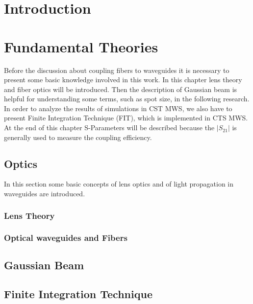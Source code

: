 
\chapter{Introduction}



\chapter{Fundamental Theories}
\label{chp:background}
Before the discussion about coupling fibers to waveguides it is necessary to present some basic knowledge involved in this work.  In this chapter lens theory and fiber optics will be introduced. Then the description of Gaussian beam is helpful for understanding some terms, such as spot size, in the following research.  
In order to analyze the results of simulations in CST MWS, we also have to present Finite Integration Technique (FIT), which is implemented in CTS MWS. At the end of this chapter S-Parameters will be described because the $|S_{21}|$ is generally used to measure the coupling efficiency.
 
\section{Optics}
\label{sect:background_optics}
In this section some basic concepts of lens optics and of light propagation in waveguides are introduced.
\subsection{Lens Theory}

\subsection{Optical waveguides and Fibers}


\section{Gaussian Beam}
\label{sect:gaussian_beam}


\section{Finite Integration Technique}
\label{sect:FIT}



